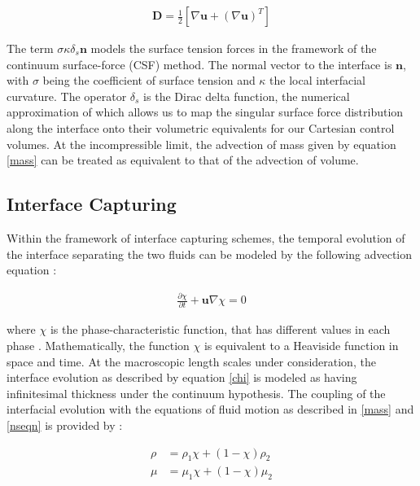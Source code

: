\begin{align}
	\boldsymbol{D} = \frac{1}{2}\left[\nabla \boldsymbol{u} + \left(\nabla \boldsymbol{u}\right)^{T}\right]  
\end{align}


The term $\sigma \kappa \delta_{s}\boldsymbol{n}$ models the surface tension forces in the 
framework of the continuum surface-force (CSF) method. The normal vector to the interface 
is $\boldsymbol{n}$, with $\sigma$ being the coefficient of surface tension and $\kappa$ the 
local interfacial curvature. The operator $\delta_{s}$ is the Dirac delta function, 
the numerical approximation of which allows us to map the singular surface force distribution
along the interface onto their volumetric equivalents for our Cartesian control volumes. 
At the incompressible limit, the advection of mass given by equation \ref{mass} can be 
treated as equivalent to that of the advection of volume.


\subsection*{Interface Capturing}
Within the framework of interface capturing schemes, the 
temporal evolution of the interface separating the two fluids
can be modeled by the following advection equation : 

\begin{align} 
	\frac{\partial \chi}{\partial t} + \boldsymbol{u}\nabla\chi = 0 	
\label{chi}
\end{align}

where $\chi$ is the phase-characteristic function, that has different values 
in each phase  . Mathematically, the function $\chi$
is equivalent to a Heaviside function in space and time. 
At the macroscopic length scales under consideration, the interface evolution
as described by equation \ref{chi} is modeled as having infinitesimal thickness
under the continuum hypothesis. The coupling of the interfacial evolution with
the equations of fluid motion as described in \ref{mass} and \ref{nseqn} is provided by :  

\begin{align}
	\rho &= \rho_{1}\chi + \left(1 - \chi\right)\rho_{2} \label {rho_chi} \\ 
	\mu  &= \mu_{1}\chi  + \left(1 - \chi\right)\mu_{2}  
  \label{mu_chi}
\end{align}

